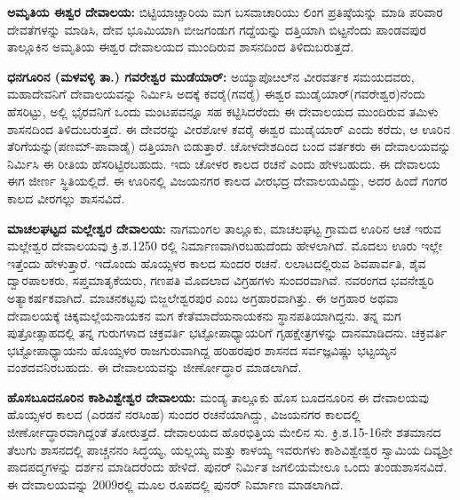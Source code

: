 \textbf{ಅಮೃತಿಯ ಈಶ್ವರ ದೇವಾಲಯ:} ಬಿಟ್ಟಿಯಾಚ್ಚಾರಿಯ ಮಗ ಬಸವಾಚಾರಿಯು ಲಿಂಗ ಪ್ರತಿಷ್ಠೆಯನ್ನು ಮಾಡಿ ಪರಿವಾರ ದೇವತೆಗಳನ್ನು ಮಾಡಿಸಿ, ದೇವ ಭೂಮಿಯಾಗಿ ಬೀಜಗಂಡುಗ ಗದ್ದೆಯನ್ನು ದತ್ತಿಯಾಗಿ ಬಿಟ್ಟನೆಂದು ಪಾಂಡವಪುರ ತಾಲ್ಲೂಕಿನ ಅಮೃತಿಯ ಈಶ್ವರ ದೇವಾಲಯದ ಮುಂದಿರುವ ಶಾಸನದಿಂದ ತಿಳಿದುಬರುತ್ತದೆ.

\textbf{ಧನಗೂರಿನ (ಮಳವಳ್ಳಿ ತಾ.) ಗವರೇಶ್ವರ ಮುಡೆಯಾರ್​:} ಅಯ್ಯಾಪೊೞಲ್​ನ ವೀರವರ್ತಕ ಸಮಯದವರು, ಮಹಾದೇವನಿಗೆ ದೇವಾಲಯವನ್ನು ನಿರ್ಮಿಸಿ ಅದಕ್ಕೆ ಕವರೈ(ಗವರೈ) ಈಶ್ವರ ಮುಡೈಯಾರ್​ (ಗವರೇಶ್ವರ)ನೆಂದು ಹೆಸರಿಟ್ಟು, ಅಲ್ಲಿ ಭೈರವನಿಗೆ ಒಂದು ಮಂಟಪವನ್ನೂ ಸಹ ಕಟ್ಟಿಸಿದರೆಂದು ಈ ದೇವಾಲಯದ ಮುಂದಿರುವ ತಮಿಳು ಶಾಸನದಿಂದ ತಿಳಿದುಬರುತ್ತದೆ. ಈ ದೇವರನ್ನು ವೀರಶೋಳ ಕವರೈ ಈಶ್ವರ ಮುಡೈಯಾರ್​ ಎಂದು ಕರೆದು, ಆ ಊರಿನ ತೆರಿಗೆಯನ್ನು\break (ಪಣಮ್-ಪಾವಾಡೈ) ದತ್ತಿಯಾಗಿ ಬಿಡುತ್ತಾರೆ. ಚೋಳದೇಶದಿಂದ ಬಂದ ವರ್ತಕರು ಈ ದೇವಾಲಯವನ್ನು ನಿರ್ಮಿಸಿ ಈ ರೀತಿಯ ಹೆಸರಿಟ್ಟಿರಬಹುದು. ಇದು ಚೋಳರ ಕಾಲದ ರಚನೆ ಎಂದು ಹೇಳಬಹುದು. ಈ ದೇವಾಲಯ ಈಗ ಜೀರ್ಣ ಸ್ಥಿತಿಯಲ್ಲಿದೆ. ಈ ಊರಿನಲ್ಲಿ ವಿಜಯನಗರ ಕಾಲದ ವೀರಭದ್ರ ದೇವಾಲಯವಿದ್ದು, ಅದರ ಹಿಂದೆ ಗಂಗರ ಕಾಲದ ವೀರಗಲ್ಲು ಶಾಸನವಿದೆ.

\textbf{ಮಾಚಲಘಟ್ಟದ ಮಲ್ಲೇಶ್ವರ ದೇವಾಲಯ:} ನಾಗಮಂಗಲ ತಾಲ್ಲೂಕು, ಮಾಚಲಘಟ್ಟ ಗ್ರಾಮದ ಊರಿನ ಆಚೆ ಇರುವ ಮಲ್ಲೇಶ್ವರ ದೇವಾಲಯವು ಕ್ರಿ.ಶ.1250 ರಲ್ಲಿ ನಿರ್ಮಾಣವಾಗಿರಬಹುದೆಂದು ಹೇಳಲಾಗಿದೆ. ಮೊದಲು ಊರು ಇಲ್ಲೇ ಇತ್ತೆಂದು ಹೇಳುತ್ತಾರೆ. ಇದೊಂದು ಹೊಯ್ಸಳರ ಕಾಲದ ಸುಂದರ ರಚನೆ. ಲಲಾಟದಲ್ಲಿರುವ ಶಿವಪಾರ್ವತಿ, ಶೈವ ದ್ವಾರಪಾಲಕರು, ಸಪ್ತಮಾತೃಕೆಯರು, ಗಣಪತಿ ಮೊದಲಾದ ವಿಗ್ರಹಗಳು ಸುಂದರವಾಗಿವೆ. ನವರಂಗದ ಭವನೇಶ್ವರಿ ಅತ್ಯಾಕರ್ಷಕವಾಗಿದೆ. ಮಾಚನಕಟ್ಟವು ಬಿಜ್ಜಲೇಶ್ವರಪುರ ಎಂಬ ಅಗ್ರಹಾರವಾಗಿತ್ತು. ಈ ಅಗ್ರಹಾರ ಅಥವಾ ದೇವಾಲಯಕ್ಕೆ ಚಿಕ್ಕಮಲ್ಲೆಯನಾಯಕನ ಮಗ ಕೇತೆಮಾದೆಯನಾಯಕನು ಸ್ಥಾನಪತಿಯಾಗಿದ್ದನು. ತನ್ನ ಮಗ ಪುತ್ರೋತ್ಸಾಹದಲ್ಲಿ ತನ್ನ ಗುರುಗಳಾದ ಚಕ್ರವರ್ತಿ ಭಟ್ಟೋಪಾಧ್ಯಾಯರಿಗೆ ಗೃಹಕ್ಷೇತ್ರಗಳನ್ನು ದಾನಮಾಡಿದನು. ಚಕ್ರವರ್ತಿ ಭಟ್ಟೋಪಾಧ್ಯಾಯನು ಹೊಯ್ಸಳರ ರಾಜಗುರುವಾಗಿದ್ದ ಹರಿಹರಪುರ ಶಾಸನದ ಸರ್ವಜ್ಞವಿಷ್ಣು ಭಟ್ಟಯ್ಯನ ವಂಶದವನಿರಬಹುದು. ಈ ದೇವಾಲಯವನ್ನು ಜೀರ್ಣೋದ್ಧಾರ ಮಾಡಲಾಗಿದೆ.

\textbf{ಹೊಸಬೂದನೂರಿನ ಕಾಶಿವಿಶ್ವೇಶ್ವರ ದೇವಾಲಯ:} ಮಂಡ್ಯ ತಾಲ್ಲೂಕು ಹೊಸ ಬೂದನೂರಿನ ಈ ದೇವಾಲಯವು ಹೊಯ್ಸಳರ ಕಾಲದ (ಎರಡನೆ ನರಸಿಂಹ) ಸುಂದರ ರಚನೆಯಾಗಿದ್ದು, ವಿಜಯನಗರ ಕಾಲದಲ್ಲಿ ಜೀರ್ಣೋದ್ಧಾರವಾಗಿದ್ದಂತೆ ತೋರುತ್ತದೆ. ದೇವಾಲಯದ ಹೊರಭಿತ್ತಿಯ ಮೇಲಿನ ಸು. ಕ್ರಿ.ಶ.15-16ನೇ ಶತಮಾನದ ತೆಲುಗು ಶಾಸನದಲ್ಲಿ ಪಾಚ್ಚನನಂ ಸಿದ್ಧಯ್ಯ, ಯಲ್ಲಯ್ಯ ಮತ್ತು ಕಾಳಯ್ಯ ಇವರುಗಳು ಕಾಶಿವಿಶ್ವೇಶ್ವರ ಸ್ವಾಮಿಯ ದಿವ್ಯಶ‍್ರೀ ಪಾದಪದ್ಮಗಳನ್ನು ದರ್ಶನ ಮಾಡಿದರೆಂದು ಹೇಳಿದೆ. ಪುನರ್​ ನಿರ್ಮಿತ ಜಗಲಿಯಮೇಲೂ ಒಂದು ತುಂಡುಶಾಸನವಿದೆ. ಈ ದೇವಾಲಯವನ್ನು 2009ರಲ್ಲಿ ಮೂಲ ರೂಪದಲ್ಲಿ ಪುನರ್​ ನಿರ್ಮಾಣ ಮಾಡಲಾಗಿದೆ.

